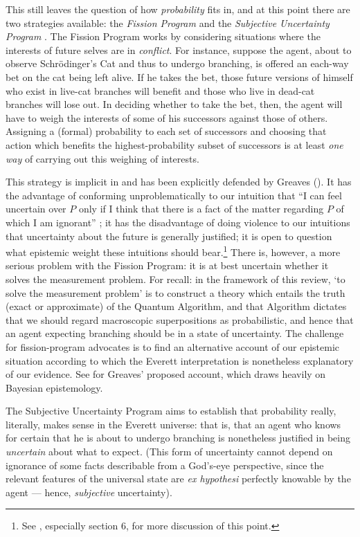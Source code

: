 \documentclass[12pt]{article}
\begin{document}
This still leaves the question of how \emph{probability} fits in, and at this point there are two strategies available: the \emph{Fission Program} and the \emph{Subjective Uncertainty Program} \cite{wallaceepist}. The Fission Program works by considering situations where the interests of future selves are in \emph{conflict}. For instance, suppose the agent, about to observe Schr\"{o}dinger's Cat and thus to undergo branching, is offered an each-way bet on the cat being left alive. If he takes the bet, those future versions of himself who exist in live-cat branches will benefit and those who live in dead-cat branches will lose out. In deciding whether to take the bet, then, the agent will have to weigh the interests of some of his successors against those of others. Assigning a (formal) probability to each set of successors and choosing that action which benefits the highest-probability subset of successors is at least \emph{one way} of carrying out this weighing of interests. 

This strategy is implicit in  and has been explicitly  defended by Greaves ().
It has the advantage of conforming unproblematically to our intuition that ``I can feel uncertain over $P$ only if I think that there is a fact of the matter regarding $P$ of which I am ignorant'' \cite{greaves}; it has the disadvantage of doing violence to our intuitions that uncertainty about the future is generally justified; it  is open to question what epistemic weight these intuitions should bear.\footnote{See , especially section 6, for more discussion of this point.} There is, however, a more serious problem with the Fission Program: it is at best uncertain whether it solves the measurement problem. For recall: in the framework of this review, `to solve the measurement problem' is to construct a theory which entails the truth (exact or approximate) of the Quantum Algorithm, and that Algorithm dictates that we should regard macroscopic superpositions as probabilistic, and hence that an agent expecting branching should be in a state of uncertainty. The challenge for fission-program advocates is to find an alternative account of our epistemic situation according to which the Everett interpretation is nonetheless explanatory of our evidence. See  for Greaves' proposed account, which draws heavily on Bayesian epistemology.

The Subjective Uncertainty Program aims to establish that probability really, literally, makes sense in the Everett universe: that is, that an agent who knows for certain that he is about to undergo branching is nonetheless justified in being \emph{uncertain} about what to expect. (This form of uncertainty cannot depend on ignorance of some facts describable from a God's-eye perspective, since the relevant features of the universal state are \emph{ex hypothesi} perfectly knowable by the agent --- hence, \emph{subjective} uncertainty). 
\end{document}
